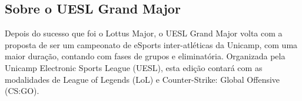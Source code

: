 \subsection{Sobre o UESL Grand Major}

Depois do sucesso que foi o Lottus Major, o UESL Grand Major volta com a proposta de ser um campeonato de eSports inter-atléticas da Unicamp, com uma maior duração, contando com fases de grupos e eliminatória. Organizada pela Unicamp Electronic Sports League (UESL), esta edição contará com as modalidades de League of Legends (LoL) e Counter-Strike: Global Offensive (CS:GO).
